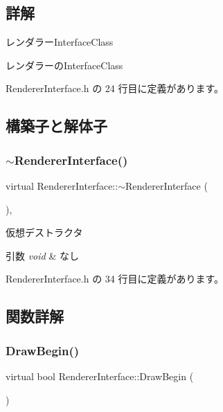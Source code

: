\subsection{詳解}
レンダラー\+Interface\+Class 

レンダラーの\+Interface\+Class 

 Renderer\+Interface.\+h の 24 行目に定義があります。



\subsection{構築子と解体子}
\mbox{\label{class_renderer_interface_a1dfa67d2c714f8c66759ab677569a750}} 
\subsubsection{\texorpdfstring{$\sim$\+Renderer\+Interface()}{~RendererInterface()}}
{\footnotesize\ttfamily virtual Renderer\+Interface\+::$\sim$\+Renderer\+Interface (\begin{DoxyParamCaption}{ }\end{DoxyParamCaption})\hspace{0.3cm}{\ttfamily [inline]}, {\ttfamily [virtual]}}



仮想デストラクタ 


\begin{DoxyParams}{引数}
{\em void} & なし \\
\hline
\end{DoxyParams}


 Renderer\+Interface.\+h の 34 行目に定義があります。



\subsection{関数詳解}
\mbox{\label{class_renderer_interface_a86a487deb4e4207a67410d00ec670fd7}} 
\subsubsection{\texorpdfstring{Draw\+Begin()}{DrawBegin()}}
{\footnotesize\ttfamily virtual bool Renderer\+Interface\+::\+Draw\+Begin (\begin{DoxyParamCaption}{ }\end{DoxyParamCaption})\hspace{0.3cm}{\ttfamily [pure virtual]}}



